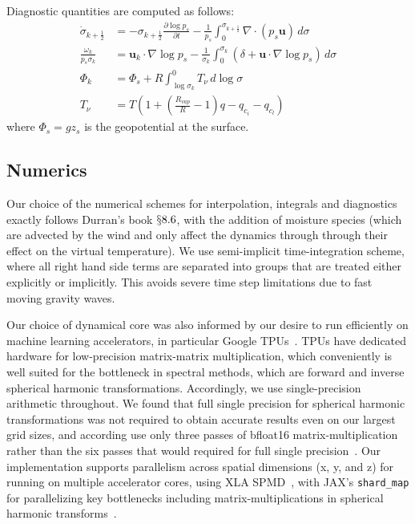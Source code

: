 \documentclass[sn-nature,Numbered]{sn-jnl}%
\begin{document}
\begin{appendices}
Diagnostic quantities are computed as follows:
\begin{align}
    \dot\sigma_{k + \frac{1}{2}} &= -\sigma_{k + \frac{1}{2}}\frac{\partial\log p_s}{\partial t} -\frac{1}{p_s}\int_0^{\sigma_{k + \frac{1}{2}}} \nabla\cdot(p_s\mathbf u)\, d\sigma \\
\frac{\omega_k}{p_s\sigma_k}
&= \mathbf u_k\cdot\nabla \log p_s
-\frac{1}{\sigma_k}\int_0^{\sigma_k}\left(\delta + \mathbf u\cdot\nabla\log p_s \right)\,d\sigma \\
    \Phi_k &= \Phi_{s} + R\int_{\log \sigma_k}^{0} T_{\nu}\,d\log\sigma \label{apx:eq:diagnostic_variables} \\
    T_{\nu} &= T(1 + \left(\frac{R_{vap}}{R} - 1 \right)q - q_{c_{i}} - q_{c_{l}})
\end{align}
where $\Phi_{s}=gz_{s}$ is the geopotential at the surface.

\subsection{Numerics}\label{apx:subsec:dycore_numerics}
Our choice of the numerical schemes for interpolation, integrals and diagnostics exactly follows Durran's book \cite{durran2010numerical} $\S8.6$, with the addition of moisture species (which are advected by the wind and only affect the dynamics through through their effect on the virtual temperature). We use semi-implicit time-integration scheme, where all right hand side terms are separated into groups that are treated either explicitly or implicitly. This avoids severe time step limitations due to fast moving gravity waves.

Our choice of dynamical core was also informed by our desire to run efficiently on machine learning accelerators, in particular Google TPUs~.
TPUs have dedicated hardware for low-precision matrix-matrix multiplication, which conveniently is well suited for the bottleneck in spectral methods, which are forward and inverse spherical harmonic transformations. Accordingly, we use single-precision arithmetic throughout.
We found that full single precision for spherical harmonic transformations was not required to obtain accurate results even on our largest grid sizes, and according use only three passes of bfloat16 matrix-multiplication rather than the six passes that would required for full single precision~.
Our implementation supports parallelism across spatial dimensions (x, y, and z) for running on multiple accelerator cores, using XLA SPMD~, with JAX's \texttt{shard\_map} for parallelizing key bottlenecks including matrix-multiplications in spherical harmonic transforms~.


\end{appendices}
\end{document}
